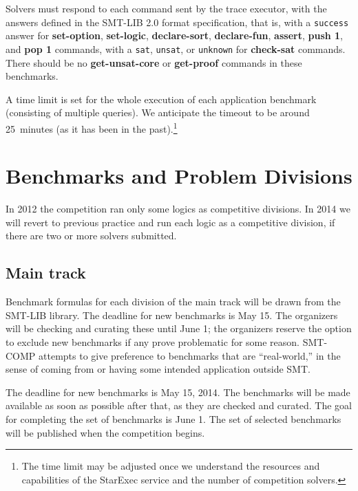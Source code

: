 \documentclass[12pt]{article}
\newcommand{\akey}[1]{\textbf{#1}}
\begin{document}
\medskip
Solvers must respond to each command sent by the trace executor, 
with the answers defined in the SMT-LIB 2.0 format specification, that is,
with a \texttt{success} answer for 
\akey{set-option}, 
\akey{set-logic}, 
\akey{declare-sort}, 
\akey{declare-fun}, 
\akey{assert}, 
\akey{push 1}, 
and \akey{pop 1} 
commands,
 with a \texttt{sat}, \texttt{unsat}, or \texttt{unknown} 
for \akey{check-sat} commands. There should be no \akey{get-unsat-core} or \akey{get-proof} commands in these benchmarks.

A time limit is set for the whole execution of each application
benchmark (consisting of multiple queries).  We anticipate the
timeout to be around 25~minutes (as it has been in the past).\footnote{The time limit may be adjusted once we understand the resources and capabilities of the StarExec service and the number of competition solvers.}



\section{Benchmarks and Problem Divisions}
\label{sec:theories}

In 2012 the competition ran only some logics as competitive divisions.
In 2014 we will revert to previous practice and run each logic as a competitive division, if there are two or more solvers submitted.

\subsection{Main track}

Benchmark formulas for each division of the main track
will be drawn from the SMT-LIB library. The deadline for new benchmarks is
May 15. The organizers will be checking and curating these until June 1;
the organizers reserve the option to exclude new benchmarks if any prove problematic for some reason.
SMT-COMP
attempts to give preference to benchmarks that are ``real-world,'' in
the sense of coming from or having some intended application outside
SMT.

The deadline for new benchmarks is May 15, 2014.
The benchmarks will be made available as soon as possible after that, as they are checked and curated.
The goal for completing the set of benchmarks is June 1.
The set of selected benchmarks will be published when the
competition begins.
\end{document}
